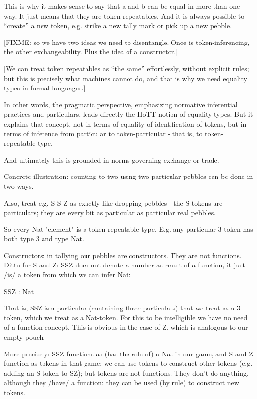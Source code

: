 \documentclass{article}
\begin{document}
This is why it makes sense to say that a and b can be equal in more
than one way.  It just means that they are token repeatables.  And it
is always possible to ``create'' a new token, e.g. strike a new tally
mark or pick up a new pebble.

[FIXME: so we have two ideas we need to disentangle.  Once is
token-inferencing, the other exchangeability.  Plus the idea of a constructor.]


[We can treat token repeatables as ``the same'' effortlessly, without
  explicit rules; but this is precisely what machines cannot do, and
  that is why we need equality types in formal languages.]

In other words, the pragmatic perspective, emphasizing normative
inferential practices and particulars, leads directly the HoTT notion
of equality types.  But it explains that concept, not in terms of
equality of identification of tokens, but in terms of inference from
particular to token-particular - that is, to token-repeatable type.

And ultimately this is grounded in norms governing exchange or trade.

Concrete illustration: counting to two using two particular pebbles
can be done in two ways.

Also, treat e.g. S S Z as exactly like dropping pebbles - the S tokens
are particulars; they are every bit as particular as particular real
pebbles.

So every Nat "element" is a token-repeatable type.  E.g. any
particular 3 token has both type 3 and type Nat.

Constructors: in tallying our pebbles are constructors.  They are not
functions.  Ditto for S and Z: SSZ does not denote a number as result
of a function, it just /is/ a token from which we can infer Nat:

    SSZ : Nat

That is, SSZ is a particular (containing three particulars) that we
treat as a 3-token, which we treat as a Nat-token.  For this to be
intelligible we have no need of a function concept.  This is obvious
in the case of Z, which is analogous to our empty pouch.

More precisely: SSZ functions as (has the role of) a Nat in our game,
and S and Z function as tokens in that game; we can use tokens to
construct other tokens (e.g. adding an S token to SZ); but tokens are
not functions.  They don't do anything, although they /have/ a
function: they can be used (by rule) to construct new tokens.
\end{document}
